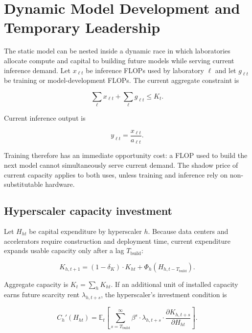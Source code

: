 \documentclass[11pt]{article}
\begin{document}
\section{Dynamic Model Development and Temporary Leadership}
\label{sec:model-race}

The static model can be nested inside a dynamic race in which laboratories allocate compute and capital to building future models while serving current inference demand. Let $x_{\ell t}$ be inference FLOPs used by laboratory $\ell$ and let $g_{\ell t}$ be training or model-development FLOPs. The current aggregate constraint is

\begin{equation}\label{eq:agg-constraint}\sum_\ell x_{\ell t}+\sum_\ell g_{\ell t}\leq K_t.\end{equation}

Current inference output is

\begin{equation}y_{\ell t}=\frac{x_{\ell t}}{a_{\ell t}}.\end{equation}

Training therefore has an immediate opportunity cost: a FLOP used to build the next model cannot simultaneously serve current demand. The shadow price of current capacity applies to both uses, unless training and inference rely on non-substitutable hardware.

\subsection{Hyperscaler capacity investment}

Let $H_{ht}$ be capital expenditure by hyperscaler $h$. Because data centers and accelerators require construction and deployment time, current expenditure expands usable capacity only after a lag $T_{\mathrm{build}}$:

\begin{equation}K_{h,t+1}=\left(1-\delta_K\right)\cdot K_{ht}+\Phi_h\left(H_{h,t-T_{\mathrm{build}}}\right).\end{equation}

Aggregate capacity is $K_t=\sum_h K_{ht}$. If an additional unit of installed capacity earns future scarcity rent $\lambda_{h,t+s}$, the hyperscaler's investment condition is

\begin{equation}C_h'(H_{ht})=\mathbb E_t\left[\sum_{s=T_{\mathrm{build}}}^{\infty}\beta^s\cdot\lambda_{h,t+s}\cdot\frac{\partial K_{h,t+s}}{\partial H_{ht}}\right].\end{equation}
\end{document}
